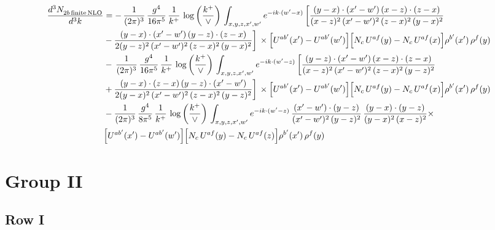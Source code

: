 \documentclass[9pt]{article}
\numberwithin{equation}{section}
\begin{document}
\begin{align}
    \frac{d^{3}N_{2b\,\rm finite\, NLO}^{\rm}}{d^{3}k} & =    -\, \frac{1}{(2\pi)^{3}}\,\frac{g^{4}}{16\pi^{5}}\,\frac{1}{k^{+}}\, \log{\left(\frac{k^{+}}{\vee}\right)}\,\int_{x,y,z,x',w'}e^{-ik\cdot(w'-x)}\, \bigg[\frac{(y-x)\cdot (x'-w')\,(x-z)\cdot (z-x)}{(x-z)^{2}\,(x'-w')^{2}\,(z-x)^{2}\,(y-x)^{2}}\notag \\ & -\frac{(y-x)\cdot (x'-w')\,(y-z)\cdot (z-x)}{2(y-z)^{2}\,(x'-w')^{2}\,(z-x)^{2}\,(y-x)^{2}}\bigg]\,\times \Big[U^{ab'}(x')-U^{ab'}(w')\Big]\Big[N_{c}\,U^{af}(y)-N_{c}\,U^{af}(x)\Big]\rho^{b'}(x')\,\rho^{f}(y)\notag \\ & -\, \frac{1}{(2\pi)^{3}}\,\frac{g^{4}}{16\pi^{5}}\,\frac{1}{k^{+}}\,\log{\left(\frac{k^{+}}{\vee}\right)}\,\int_{x,y,z,x',w'}e^{-ik\cdot(w'-z)}\,\bigg[\frac{(y-z)\cdot (x'-w')\,(x-z)\cdot (z-x)}{(x-z)^{2}\,(x'-w')^{2}\,(z-x)^{2}\,(y-z)^{2}}\notag \\ & +\frac{(y-x)\cdot (z-x)\,(y-z)\cdot (x'-w')}{2(y-x)^{2}\,(x'-w')^{2}\,(z-x)^{2}\,(y-z)^{2}}\bigg]\,\times \Big[U^{ab'}(x')-U^{ab'}(w')\Big]\Big[N_{c}\,U^{af}(y)-N_{c}\,U^{af}(x)\Big]\rho^{b'}(x')\,\rho^{f}(y)\notag \\ & - \frac{1}{(2\pi)^{3}}\,\frac{g^{4}}{8\pi^{5}}\,\frac{1}{k^{+}}\,\log{\left(\frac{k^{+}}{\vee}\right)}\,\int_{x,y,z,x',w'}e^{-ik\cdot(w'-z)}\,\frac{(x'-w')\cdot(y-z)}{(x'-w')^{2}\,(y-z)^{2}}\,\frac{(y-x)\cdot(y-z)}{(y-x)^{2}\,(x-z)^{2}}\times\notag \\ & \Big[U^{ab'}(x')-U^{ab'}(w')\Big]\Big[N_{c}\,U^{af}(y)-N_{c}\,U^{af}(z)\Big]\rho^{b'}(x')\,\rho^{f}(y)
\end{align}
\section{Group II}
\subsection{Row I}
\end{document}
